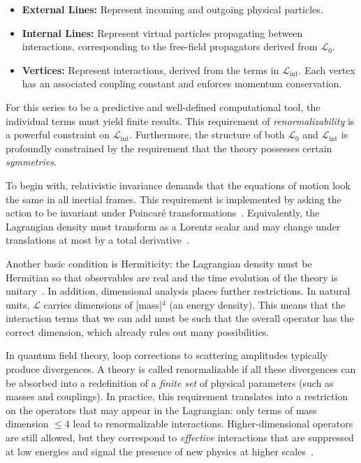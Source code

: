 \begin{itemize}
    \item \textbf{External Lines:} Represent incoming and outgoing physical particles.
    \item \textbf{Internal Lines:} Represent virtual particles propagating between interactions, corresponding to the free-field propagators derived from $\mathcal{L}_0$.
    \item \textbf{Vertices:} Represent interactions, derived from the terms in $\mathcal{L}_{\text{int}}$. Each vertex has an associated coupling constant and enforces momentum conservation.
\end{itemize}

For this series to be a predictive and well-defined computational tool, the individual terms must yield finite results. This requirement of \textit{renormalizability} is a powerful constraint on $\mathcal{L}_{\text{int}}$. Furthermore, the structure of both $\mathcal{L}_0$ and $\mathcal{L}_{\text{int}}$ is profoundly constrained by the requirement that the theory possesses certain \textit{symmetries}.

To begin with, relativistic invariance demands that the equations of motion look the same in all inertial frames. This requirement is implemented by asking the action to be invariant under Poincaré transformations~\parencite{pall}. Equivalently, the Lagrangian density must transform as a Lorentz scalar and may change under translations at most by a total derivative~\parencite{jose1998classical}. 

Another basic condition is Hermiticity: the Lagrangian density must be Hermitian so that observables are real and the time evolution of the theory is unitary~\parencite{pall,peskin}. In addition, dimensional analysis places further restrictions. In natural units, $\mathcal{L}$ carries dimensions of [mass]$^4$ (an energy density). This means that the interaction terms that we can add must be such that the overall operator has the correct dimension, which already rules out many possibilities. 

In quantum field theory, loop corrections to scattering amplitudes typically produce divergences. A theory is called renormalizable if all these divergences can be absorbed into a redefinition of a \emph{finite set} of physical parameters (such as masses and couplings). In practice, this requirement translates into a restriction on the operators that may appear in the Lagrangian: only terms of mass dimension $\leq 4$ lead to renormalizable interactions. Higher-dimensional operators are still allowed, but they correspond to \emph{effective} interactions that are suppressed at low energies and signal the presence of new physics at higher scales~\parencite{peskin,Weinberg}. 

